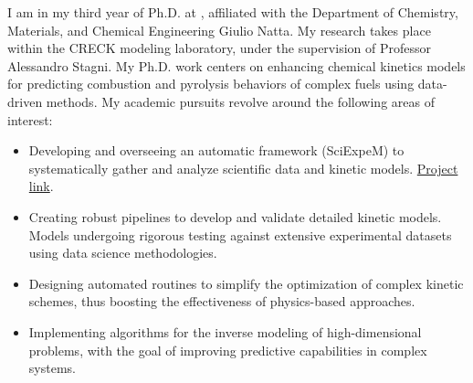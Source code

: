 I am in my third year of Ph.D. at \polimi, affiliated with the Department of
Chemistry, Materials, and Chemical Engineering Giulio Natta. My research takes place
within the CRECK modeling laboratory, under the supervision of Professor Alessandro
Stagni. My Ph.D. work centers on enhancing chemical kinetics models for predicting
combustion and pyrolysis behaviors of complex fuels using data-driven methods.
My academic pursuits revolve around the following areas of interest:
\begin{itemize}
   \item Developing and overseeing an automatic framework (SciExpeM) to systematically
      gather and analyze scientific data and kinetic models.
      \href{https://sciexpem.polimi.it}{Project link}.

   \item Creating robust pipelines to develop and validate detailed kinetic models.
      Models undergoing rigorous testing against extensive experimental datasets using
      data science methodologies.

   \item Designing automated routines to simplify the optimization of complex kinetic
      schemes, thus boosting the effectiveness of physics-based approaches.

   \item Implementing algorithms for the inverse modeling of high-dimensional problems,
      with the goal of improving predictive capabilities in complex systems.
\end{itemize}
